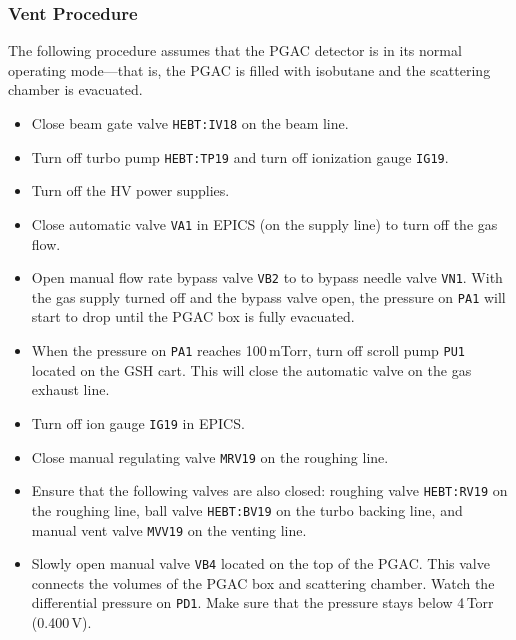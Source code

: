 \subsubsection{Vent Procedure}
The following procedure assumes that the PGAC detector is in its normal operating mode---that is, the PGAC is filled with isobutane and the scattering chamber is evacuated. %
\begin{itemize}
\setlength{\itemsep}{0pt}
\setlength{\parskip}{0pt}
\setlength{\parsep}{0pt}
\item Close beam gate valve \texttt{HEBT:IV18} on the beam line.
\item Turn off turbo pump \texttt{HEBT:TP19}  and turn off ionization gauge \texttt{IG19}.
\item Turn off the HV power supplies.
\item Close automatic valve \texttt{VA1} in EPICS (on the supply line) to turn off the gas flow.
\item Open manual flow rate bypass valve \texttt{VB2} to to bypass needle valve \texttt{VN1}. With the gas supply turned off and the bypass valve open, the pressure on \texttt{PA1} will start to drop until the PGAC box is fully evacuated. 
\item When the pressure on \texttt{PA1} reaches 100\,mTorr, turn off scroll pump \texttt{PU1} located on the GSH cart. This will close the automatic valve on the gas exhaust line.
\item Turn off ion gauge \texttt{IG19} in EPICS.
\item Close manual regulating valve \texttt{MRV19} on the roughing line. 
\item Ensure that the following valves are also closed: roughing valve \texttt{HEBT:RV19} on the roughing line, ball valve \texttt{HEBT:BV19} on the turbo backing line, and manual vent valve \texttt{MVV19} on the venting line.
\item Slowly open manual valve \texttt{VB4} located on the top of the PGAC.  This valve connects the volumes of the PGAC box and scattering chamber. Watch the differential pressure on \texttt{PD1}.  Make sure that the pressure stays below 4\,Torr (0.400\,V).

\end{itemize}
